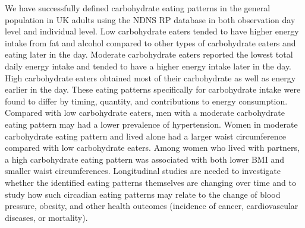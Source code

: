 We have successfully defined carbohydrate eating patterns in the general population in UK adults using the NDNS RP database in both observation day level and individual level. Low carbohydrate eaters tended to have higher energy intake from fat and alcohol compared to other types of carbohydrate eaters and eating later in the day. Moderate carbohydrate eaters reported the lowest total daily energy intake and tended to have a higher energy intake later in the day. High carbohydrate eaters obtained most of their carbohydrate as well as energy earlier in the day. These eating patterns specifically for carbohydrate intake were found to differ by timing, quantity, and contributions to energy consumption. Compared with low carbohydrate eaters, men with a moderate carbohydrate eating pattern may had a lower prevalence of hypertension. Women in moderate carbohydrate eating pattern and lived alone had a larger waist circumference compared with low carbohydrate eaters. Among women who lived with partners, a high carbohydrate eating pattern was associated with both lower BMI and smaller waist circumferences. Longitudinal studies are needed to investigate whether the identified eating patterns themselves are changing over time and to study how such circadian eating patterns may relate to the change of blood pressure, obesity, and other health outcomes (incidence of cancer, cardiovascular diseases, or mortality).